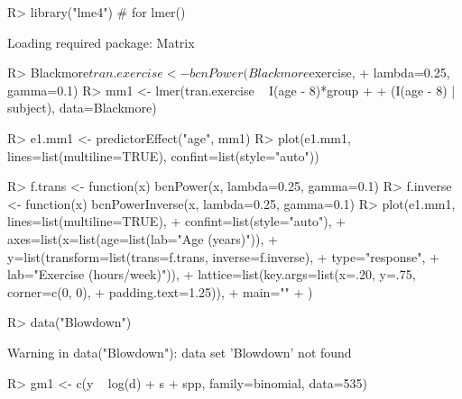 \documentclass[
]{article}
\begin{document}
\begin{Schunk}
\begin{Sinput}
R> library("lme4") # for lmer()
\end{Sinput}
\begin{Soutput}
Loading required package: Matrix
\end{Soutput}
\begin{Sinput}
R> Blackmore$tran.exercise <- bcnPower(Blackmore$exercise, 
+                                        lambda=0.25, gamma=0.1)
R> mm1 <- lmer(tran.exercise ~ I(age - 8)*group +
+                  (I(age - 8) | subject), data=Blackmore)
\end{Sinput}
\end{Schunk}
\begin{Schunk}
\begin{Sinput}
R> e1.mm1 <- predictorEffect("age", mm1)
R> plot(e1.mm1, lines=list(multiline=TRUE), confint=list(style="auto"))
\end{Sinput}
\end{Schunk}
\begin{Schunk}
\begin{Sinput}
R> f.trans <- function(x) bcnPower(x, lambda=0.25, gamma=0.1)
R> f.inverse <- function(x) bcnPowerInverse(x, lambda=0.25, gamma=0.1)
R> plot(e1.mm1, lines=list(multiline=TRUE),
+         confint=list(style="auto"),
+         axes=list(x=list(age=list(lab="Age (years)")),
+                   y=list(transform=list(trans=f.trans, inverse=f.inverse),
+                          type="response",
+                          lab="Exercise (hours/week)")),
+         lattice=list(key.args=list(x=.20, y=.75, corner=c(0, 0), 
+                                    padding.text=1.25)),
+         main=""
+    )
\end{Sinput}
\end{Schunk}
\begin{Schunk}
\begin{Sinput}
R> data("Blowdown")
\end{Sinput}
\begin{Soutput}
Warning in data("Blowdown"): data set 'Blowdown' not found
\end{Soutput}
\begin{Sinput}
R> gm1 <- c(y ~ log(d) + s + spp, family=binomial, data=535)
\end{Sinput}
\end{Schunk}
\end{document}

